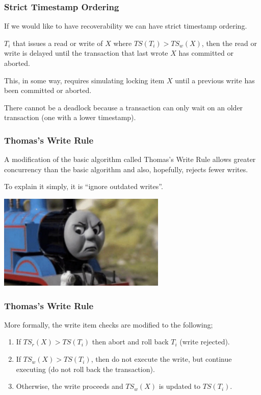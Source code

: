 \begin{frame}
\frametitle{Strict Timestamp Ordering}
If we would like to have recoverability we can have strict timestamp ordering.

$T_{i}$ that issues a read or write of $X$ where $T\!S(T_{i}) > T\!S_{w}(X)$, then the read or write is delayed until the transaction that last wrote $X$ has committed or aborted. 

This, in some way, requires simulating locking item $X$ until a previous write has been committed or aborted.

There cannot be a deadlock because a transaction can only wait on an older transaction (one with a lower timestamp).

\end{frame}

\begin{frame}
\frametitle{Thomas's Write Rule}
A modification of the basic algorithm called Thomas's Write Rule allows greater concurrency than the basic algorithm and also, hopefully, rejects fewer writes. 

To explain it simply, it is ``ignore outdated writes''.

\begin{center}
	\includegraphics[width=0.6\textwidth]{images/thomas.png}
\end{center}

\end{frame}

\begin{frame}
\frametitle{Thomas's Write Rule}

More formally, the write item checks are modified to the following;
\begin{enumerate}
	\item If $T\!S_{r}(X) > T\!S(T_{i})$ then abort and roll back $T_{i}$ (write rejected).
	\item If $T\!S_{w}(X) > T\!S(T_{i})$, then do not execute the write, but continue executing (do not roll back the transaction).
	\item Otherwise, the write proceeds and $T\!S_{w}(X)$ is updated to $T\!S(T_{i})$. 
\end{enumerate}

\end{frame}

